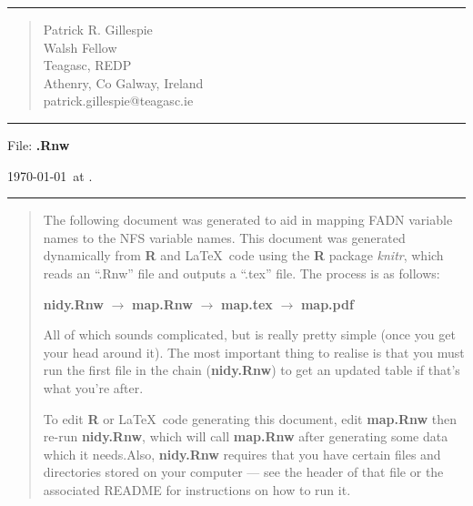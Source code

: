 \documentclass{article}\usepackage[]{graphicx}\usepackage[]{color}
\begin{document}
  \begin{flushleft}
    \hrule
    \vspace{6pt}
    \begin{quote}
      Patrick R. Gillespie\\
      Walsh Fellow\\
      Teagasc, REDP\\
      Athenry, Co Galway, Ireland\\
      patrick.gillespie@teagasc.ie
    \end{quote}
    \vspace{6pt}
    \hrule
    \vspace{6pt}
    File: \textbf{\jobname.Rnw}
    
    \today \  at \currenttime.
    \vspace{6pt}
    \hrule
    \vspace{1cm}
    
    
    \begin{quote}
      The following document was generated to aid in mapping FADN variable names to the NFS variable
      names. This document was generated dynamically from \textbf{R} and \LaTeX\ code using the
      \textbf{R} package \emph{knitr}, which reads an ``.Rnw'' file and outputs a ``.tex'' file. The process is as follows:
      
      \vspace{12pt}
      \textbf{nidy.Rnw} $\rightarrow$ 
      \textbf{map.Rnw} $\rightarrow$
      \textbf{map.tex} $\rightarrow$ \textbf{map.pdf}
      \vspace{12pt}
    
      All of which sounds complicated, but is really pretty simple (once you get your head around
      it). The most important thing to realise is that you must run the first file in the chain 
      (\textbf{nidy.Rnw}) to get an updated table if that's what you're after. 
      
      \vspace{12pt}
      
      To edit \textbf{R} or \LaTeX\ code generating this document, edit \textbf{map.Rnw} then 
      re-run \textbf{nidy.Rnw}, which will call \textbf{map.Rnw} after generating some data which
      it needs.Also, \textbf{nidy.Rnw} requires that you have certain files and directories stored
      on your computer --- see the header of that file or the associated README for instructions on
      how to run it.
      
      \vspace{12pt}
      

\end{quote}
\end{flushleft}
\end{document}

